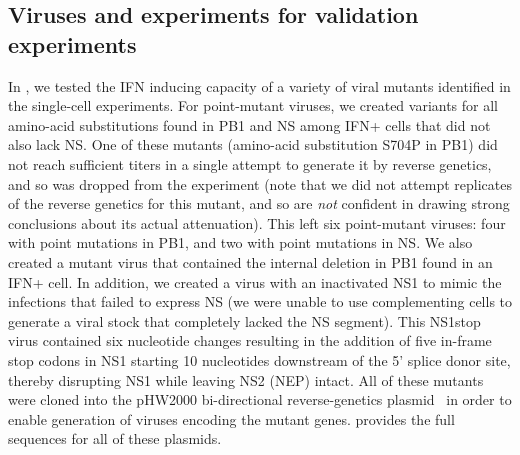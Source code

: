 \documentclass[9pt,lineno]{elife}
\begin{document}
\subsection{Viruses and experiments for validation experiments}
In , we tested the IFN inducing capacity of a variety of viral mutants identified in the single-cell experiments.
For point-mutant viruses, we created variants for all amino-acid substitutions found in PB1 and NS among IFN+ cells that did not also lack NS.
One of these mutants (amino-acid substitution S704P in PB1) did not reach sufficient titers in a single attempt to generate it by reverse genetics, and so was dropped from the experiment (note that we did not attempt replicates of the reverse genetics for this mutant, and so are \emph{not} confident in drawing strong conclusions about its actual attenuation).
This left six point-mutant viruses: four with point mutations in PB1, and two with point mutations in NS.
We also created a mutant virus that contained the internal deletion in PB1 found in an IFN+ cell.
In addition, we created a virus with an inactivated NS1 to mimic the infections that failed to express NS (we were unable to use complementing cells to generate a viral stock that completely lacked the NS segment).
This NS1stop virus contained six nucleotide changes resulting in the addition of five in-frame stop codons in NS1 starting 10 nucleotides downstream of the 5' splice donor site, thereby disrupting NS1 while leaving NS2 (NEP) intact.
All of these mutants were cloned into the pHW2000 bi-directional reverse-genetics plasmid~\citep{hoffmann2000dna} in order to enable generation of viruses encoding the mutant genes.
  provides the full sequences for all of these plasmids.
\end{document}
